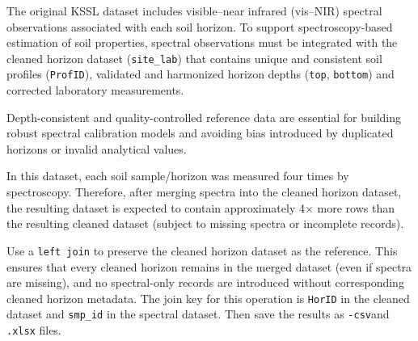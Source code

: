\documentclass[
  10pt,
  b5paper,
  oneside]{book}
\begin{document}
The original KSSL dataset includes visible--near infrared (vis--NIR) spectral observations associated with each soil horizon. To support spectroscopy-based estimation of soil properties, spectral observations must be integrated with the cleaned horizon dataset (\texttt{site\_lab}) that contains unique and consistent soil profiles (\texttt{ProfID}), validated and harmonized horizon depths (\texttt{top}, \texttt{bottom}) and corrected laboratory measurements.

Depth-consistent and quality-controlled reference data are essential for building robust spectral calibration models and avoiding bias introduced by duplicated horizons or invalid analytical values.

In this dataset, each soil sample/horizon was measured four times by spectroscopy. Therefore, after merging spectra into the cleaned horizon dataset, the resulting dataset is expected to contain approximately 4× more rows than the resulting cleaned dataset (subject to missing spectra or incomplete records).

Use a \texttt{left\ join} to preserve the cleaned horizon dataset as the reference. This ensures that every cleaned horizon remains in the merged dataset (even if spectra are missing), and no spectral-only records are introduced without corresponding cleaned horizon metadata. The join key for this operation is \texttt{HorID} in the cleaned dataset and \texttt{smp\_id} in the spectral dataset. Then save the results as \texttt{-csv}and \texttt{.xlsx} files.
\end{document}
